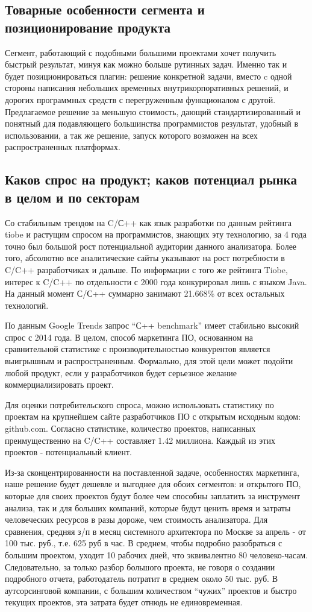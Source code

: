 \subsection{Товарные особенности сегмента и позиционирование продукта}	
	Сегмент, работающий с подобными большими проектами хочет получить быстрый результат, минуя как можно больше рутинных задач.
	Именно так и будет позиционироваться плагин: решение конкретной задачи, вместо c одной стороны написания небольших временных внутрикорпоративных решений, и дорогих программных средств с перегруженным функционалом с другой. Предлагаемое решение за меньшую стоимость, дающий стандартизированный и понятный для подавляющего большинства программистов результат, удобный в использовании, а так же решение, запуск которого возможен на всех распространенных платформах.
	
\subsection{Каков спрос на продукт; каков потенциал рынка в целом и по секторам} \label{subseq:demand_for_product}
	Со стабильным трендом на C/С++ как язык разработки по данным рейтинга tiobe и растущим спросом на программистов, знающих эту технологию, за 4 года точно был большой рост потенциальной аудитории данного анализатора. Более того, абсолютно все аналитические сайты указывают на рост потребности в C/C++ разработчиках и дальше. По информации с того же рейтинга Tiobe, интерес к C/C++ по отдельности с 2000 года конкурировал лишь с языком Java. На данный момент С/С++ суммарно занимают 21.668\% от всех остальных технологий.
	
	По данным Google Trends запрос \enquote{С++ benchmark} имеет стабильно высокий спрос с 2014 года. В целом, способ маркетинга ПО, основанном на сравнительной статистике с производительностью конкурентов является выигрышным и распространенным. Формально, для этой цели может подойти любой продукт, если у разработчиков будет серьезное желание коммерциализировать проект.
	
	Для оценки потребительского спроса, можно использовать статистику по проектам на крупнейшем сайте разработчиков ПО с открытым исходным кодом: github.com. Согласно статистике, количество проектов, написанных преимущественно на C/C++ составляет 1.42 миллиона. Каждый из этих проектов - потенциальный клиент.
	
	Из-за сконцентрированности на поставленной задаче, особенностях маркетинга, наше решение будет дешевле и выгоднее для обоих сегментов: и открытого ПО, которые для своих проектов будут более чем способны заплатить за инструмент анализа, так и для больших компаний, которые будут ценить время и затраты человеческих ресурсов в разы дороже, чем стоимость анализатора. Для сравнения, средняя з/п в месяц системного архитектора по Москве за апрель - от 100 тыс. руб., т.е. 625 руб в час. В среднем, чтобы подробно разобраться с большим проектом, уходит 10 рабочих дней, что эквивалентно 80 человеко-часам. Следовательно, за только разбор большого проекта, не говоря о создании подробного отчета, работодатель потратит в среднем около 50 тыс. руб. В аутсорсинговой компании, с большим количеством \enquote{чужих} проектов и быстро текущих проектов, эта затрата будет отнюдь не единовременная. 
	
